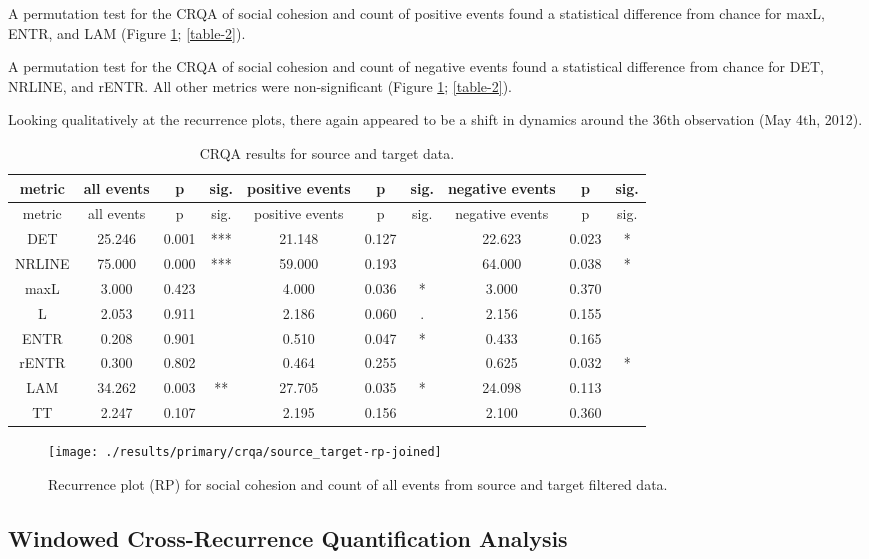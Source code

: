\documentclass[english,man]{apa6}
\begin{document}
A permutation test for the CRQA of social cohesion and count of positive events
found a statistical difference from chance for maxL, ENTR, and LAM (Figure
\ref{fig:plot-rp-source-targ}; \autoref{table-2}).

A permutation test for the CRQA of social cohesion and count of negative events
found a statistical difference from chance for DET, NRLINE, and rENTR. All other
metrics were non-significant (Figure \ref{fig:plot-rp-source-targ};
\autoref{table-2}).

Looking qualitatively at the recurrence plots, there again appeared to be a
shift in dynamics around the 36th observation (May 4th, 2012).

\begin{longtable}[]{@{}cccccccccc@{}}
\caption{\label{table-2}CRQA results for source and target data.}\tabularnewline
\toprule
metric & all events & p & sig. & positive events & p & sig. & negative events & p & sig.\tabularnewline
\midrule
\endfirsthead
\toprule
metric & all events & p & sig. & positive events & p & sig. & negative events & p & sig.\tabularnewline
\midrule
\endhead
DET & 25.246 & 0.001 & *** & 21.148 & 0.127 & & 22.623 & 0.023 & *\tabularnewline
NRLINE & 75.000 & 0.000 & *** & 59.000 & 0.193 & & 64.000 & 0.038 & *\tabularnewline
maxL & 3.000 & 0.423 & & 4.000 & 0.036 & * & 3.000 & 0.370 &\tabularnewline
L & 2.053 & 0.911 & & 2.186 & 0.060 & . & 2.156 & 0.155 &\tabularnewline
ENTR & 0.208 & 0.901 & & 0.510 & 0.047 & * & 0.433 & 0.165 &\tabularnewline
rENTR & 0.300 & 0.802 & & 0.464 & 0.255 & & 0.625 & 0.032 & *\tabularnewline
LAM & 34.262 & 0.003 & ** & 27.705 & 0.035 & * & 24.098 & 0.113 &\tabularnewline
TT & 2.247 & 0.107 & & 2.195 & 0.156 & & 2.100 & 0.360 &\tabularnewline
\bottomrule
\end{longtable}

\begin{figure}
\texttt{[image: ./results/primary/crqa/source\_target-rp-joined]} \caption{Recurrence plot (RP) for social cohesion and count of all events from source and target filtered data.}\label{fig:plot-rp-source-targ}
\end{figure}

\hypertarget{windowed-cross-recurrence-quantification-analysis-1}{%
\subsection{Windowed Cross-Recurrence Quantification Analysis}\label{windowed-cross-recurrence-quantification-analysis-1}}
\end{document}
